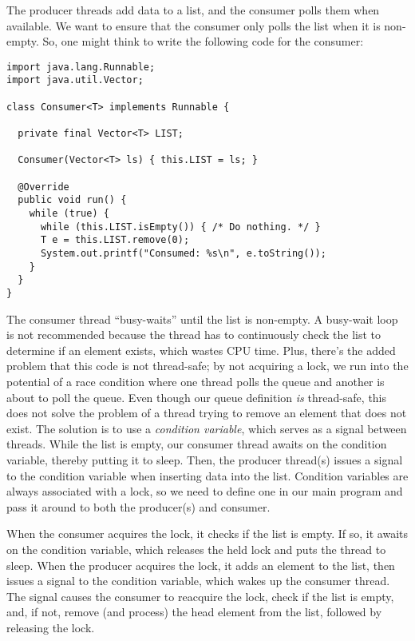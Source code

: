 The producer threads add data to a list, and the consumer polls them when available. 
We want to ensure that the consumer only polls the list when it is non-empty. 
So, one might think to write the following code for the consumer:

\begin{lstlisting}[language=MyJava]
import java.lang.Runnable;
import java.util.Vector;

class Consumer<T> implements Runnable {

  private final Vector<T> LIST;

  Consumer(Vector<T> ls) { this.LIST = ls; }

  @Override
  public void run() {
    while (true) {
      while (this.LIST.isEmpty()) { /* Do nothing. */ }
      T e = this.LIST.remove(0);
      System.out.printf("Consumed: %s\n", e.toString());
    }
  }
}
\end{lstlisting}

The consumer thread ``busy-waits'' until the list is non-empty. 
A busy-wait loop is not recommended because the thread has to continuously check the list to determine if an element exists, which wastes CPU time. 
Plus, there's the added problem that this code is not thread-safe; by not acquiring a lock, we run into the potential of a race condition where one thread polls the queue and another is about to poll the queue. 
Even though our queue definition \emph{is} thread-safe, this does not solve the problem of a thread trying to remove an element that does not exist. 
The solution is to use a \emph{condition variable}, which serves as a signal between threads. 
While the list is empty, our consumer thread awaits on the condition variable, thereby putting it to sleep. 
Then, the producer thread(s) issues a signal to the condition variable when inserting data into the list. 
Condition variables are always associated with a lock, so we need to define one in our main program and pass it around to both the producer(s) and consumer. 

When the consumer acquires the lock, it checks if the list is empty. 
If so, it awaits on the condition variable, which releases the held lock and puts the thread to sleep. 
When the producer acquires the lock, it adds an element to the list, then issues a signal to the condition variable, which wakes up the consumer thread. 
The signal causes the consumer to reacquire the lock, check if the list is empty, and, if not, remove (and process) the head element from the list, followed by releasing the lock.

